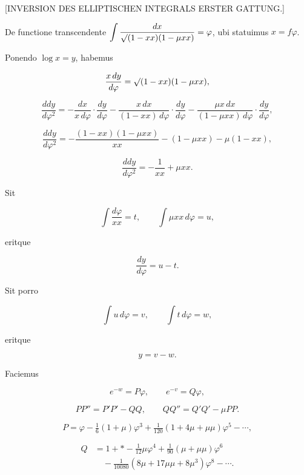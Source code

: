 \clearpage
{}%

\begin{center}
\large [INVERSION DES ELLIPTISCHEN INTEGRALS ERSTER GATTUNG.]
\end{center}

\bigskip

\noindent\hspace*{\parindent}De functione transcendente $\displaystyle\int\frac{dx}{\mathord{\surd}(1-xx)(1-\mu xx)}=\varphi$, ubi statuimus \mbox{$x=f\varphi$}.

Ponendo $\log x = y$, habemus

\[ \frac{x\,dy}{d\varphi} = \mathord{\surd}(1-xx)(1-\mu xx), \]

\[ \frac{ddy}{d\varphi^2} = -\frac{dx}{x\,d\varphi}\cdot\frac{dy}{d\varphi} - \frac{x\,dx}{(1-xx)\,d\varphi}\cdot\frac{dy}{d\varphi} - \frac{\mu x\,dx}{(1-\mu xx)\,d\varphi}\cdot\frac{dy}{d\varphi}, \]

\[ \frac{ddy}{d\varphi^2} = -\frac{(1-xx)(1-\mu xx)}{xx} - (1-\mu xx) - \mu(1-xx), \]

\[ \frac{ddy}{d\varphi^2} = -\frac{1}{xx} + \mu xx. \]

\noindent Sit

\[ \int\frac{d\varphi}{xx} = t, \qquad \int \mu xx\,d\varphi = u, \]

\noindent eritque

\[ \frac{dy}{d\varphi} = u - t. \]

\noindent Sit porro

\[ \int u\,d\varphi = v, \qquad \int t\,d\varphi = w, \]

\noindent eritque

\[ y = v - w. \]

\noindent Faciemus

\[ e^{-w} = P\varphi, \qquad e^{-v} = Q\varphi, \]

\[ PP'' = P'P' - QQ, \qquad QQ'' = Q'Q' - \mu PP. \]

\[ P = \varphi - \tfrac{1}{6}(1+\mu)\varphi^3 + \tfrac{1}{120}(1+4\mu+\mu\mu)\varphi^5 - \cdots, \]

\[\begin{aligned} Q &= 1+\ast-\tfrac{1}{12}\mu\varphi^4+\tfrac{1}{90}(\mu+\mu\mu)\varphi^6\\&\quad-\tfrac{1}{10080}(8\mu+17\mu\mu+8\mu^3)\varphi^8-\cdots.\end{aligned}\]

\bigskip

